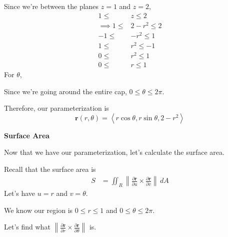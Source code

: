 \documentclass{article}
\newcommand{\lra}[1]{\left\langle #1 \right\rangle}
\newcommand{\norm}[1]{\left\lVert #1 \right\rVert}
\renewcommand{\r}[0]{\mathbf{r}}
\begin{document}
Since we're between the planes $z=1$ and $z=2$,
\begin{align*}
    1\leq&z\leq 2\\
    \implies 1\leq &2- r^2\leq 2\\
    -1 \leq & -r^2 \leq 1\\
    1 \leq & r^2 \leq -1\\
    0  \leq &r^2 \leq 1\tag{$r^2\geq 0$ is always true}\\
    0 \leq& r\leq 1\tag{$r\geq 0$ is always true}
\end{align*}
For $\theta$,

Since we're going around the entire cap, $0\leq \theta\leq 2\pi$.

Therefore, our parameterization is
\begin{equation*}
    \r(r,\theta)=\lra{r\cos\theta, r\sin\theta, 2-r^2}\tag{$0\leq r\leq 1$, $0\leq \theta\leq 2\pi$}
\end{equation*}
{}\textbf{Surface Area}

Now that we have our parameterization, let's calculate the surface area.

Recall that the surface area is
\begin{align*}
    S&=\iint_R \norm{\frac{\partial \r}{\partial u}\times \frac{\partial \r}{\partial v}}\,dA
\end{align*}
Let's have $u=r$ and $v=\theta$.

We know our region is $0\leq r\leq 1$ and $0\leq \theta\leq 2\pi$.

Let's find what $\displaystyle\norm{\frac{\partial \r}{\partial r}\times \frac{\partial \r}{\partial \theta}} $ is.
\end{document}
